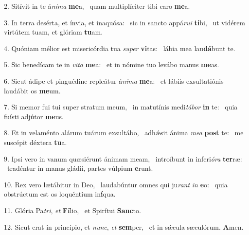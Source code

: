 2. Sitívit in te á\textit{ni}\textit{ma} \textbf{me}a, \ast\  quam multiplíciter tibi caro \textbf{me}a.\

3. In terra desérta, et ínvia, et inaquósa: \dag\  sic in sancto appá\textit{ru}\textit{i} \textbf{ti}bi, \ast\  ut vidérem virtútem tuam, et glóriam \textbf{tu}am.\

4. Quóniam mélior est misericórdia tua \textit{su}\textit{per} \textbf{vi}tas: \ast\  lábia mea lau\textbf{dá}bunt te.\

5. Sic benedícam te in \textit{vi}\textit{ta} \textbf{me}a: \ast\  et in nómine tuo levábo manus \textbf{me}as.\

6. Sicut ádipe et pinguédine repleátur á\textit{ni}\textit{ma} \textbf{me}a: \ast\  et lábiis exsultatiónis laudábit os \textbf{me}um.\

7. Si memor fui tui super stratum meum, \dag\  in matutínis medi\textit{tá}\textit{bor} \textbf{in} te: \ast\  quia fuísti adjútor \textbf{me}us.\

8. Et in velaménto alárum tuárum exsultábo, \dag\  adhǽsit ánima \textit{me}\textit{a} \textbf{post} te: \ast\  me suscépit déxtera \textbf{tu}a.\

9. Ipsi vero in vanum quæsiérunt ánimam meam, \dag\  introíbunt in inferi\textit{ó}\textit{ra} \textbf{ter}ræ: \ast\  tradéntur in manus gládii, partes vúlpium \textbf{e}runt.\

10. Rex vero lætábitur in Deo, \dag\  laudabúntur omnes qui ju\textit{rant} \textit{in} \textbf{e}o: \ast\  quia obstrúctum est os loquéntium in\textbf{í}qua.\

11. Glória Pa\textit{tri}, \textit{et} \textbf{Fí}lio, \ast\  et Spirítui \textbf{Sanc}to.\

12. Sicut erat in princípio, et \textit{nunc}, \textit{et} \textbf{sem}per, \ast\  et in sǽcula sæculórum. \textbf{A}men.\

